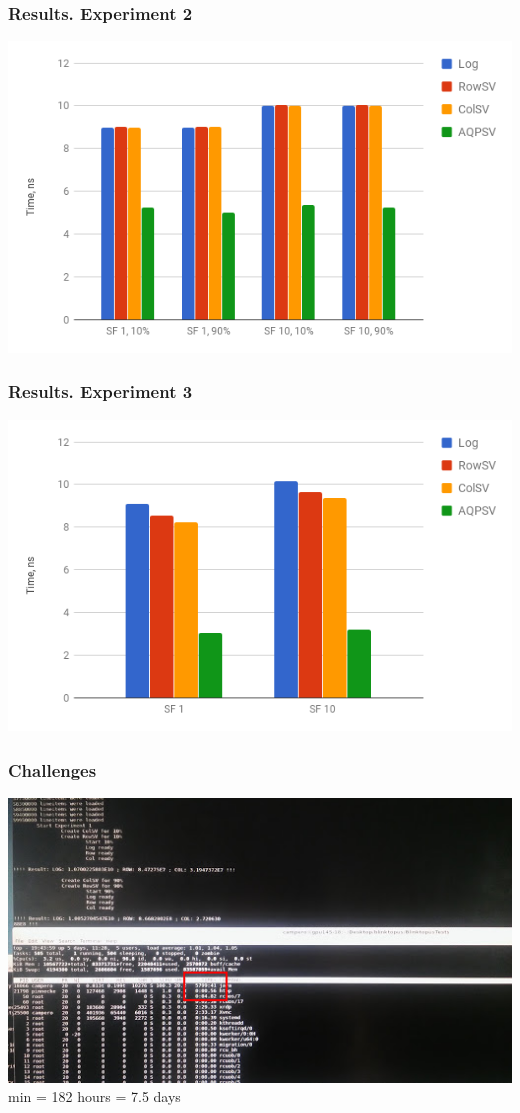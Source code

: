 \documentclass{beamer}
\begin{document}
\begin{frame}
\frametitle{Results. Experiment 2}
\centering
\includegraphics[scale=0.5]{img/exp2.png}
\end{frame}

\begin{frame}
\frametitle{Results. Experiment 3}
\centering
\includegraphics[scale=0.5]{img/exp3.png}
\end{frame}

\begin{frame}
\frametitle{Challenges} \pause
\centering
\includegraphics[scale=0.5]{img/beast.jpg} \\  min = 182 hours = 7.5 days
\end{frame}
\end{document}
